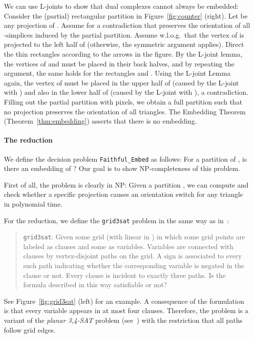 \documentclass[12pt]{article}
\begin{document}
We can use L-joints to show that dual complexes cannot always be embedded:
Consider the (partial) rectangular partition in Figure~\ref{fig:counter} (right).
Let  be any projection of . 
Assume for a contradiction that  preserves the orientation
of all -simplices induced by the partial partition. 
Assume w.l.o.g.\ that the vertex of  is projected
to the left half of  (otherwise, the symmetric argument applies).
Direct the thin rectangles according to the arrows in the figure.
By the L-joint lemma, the vertices of  and  must be placed in their
back halves, and by repeating the argument, the same holds for the rectangles  and .
Using the L-joint Lemma again, the vertex of  must be placed in the upper half of 
(caused by the L-joint with ) and also in the lower half of  (caused by the L-joint
with ), a contradiction.
Filling out the partial partition with pixels, we obtain a full partition  such that
no projection preserves the orientation of all triangles. The Embedding Theorem (Theorem~\ref{thm:embedding}) asserts
that there is no embedding.

\paragraph{The reduction}
We define the decision problem \texttt{Faithful\_Embed} as follows:
For a partition
 of , is there an embedding of ?
Our goal is to show NP-completeness of this problem. 

First of all, the problem is clearly in NP: Given a partition , 
we can compute  and check whether a specific projection causes an orientation switch 
for any triangle in polynomial time.

For the reduction, 
we define the \texttt{grid3sat} problem in the same way as in~\cite{godau-difficulty}:
\begin{quotation}
\texttt{grid3sat}: 
Given some  grid (with  linear in ) in which some grid points are labeled
as clauses and some as variables. Variables are connected with clauses by vertex-disjoint
paths on the grid. A sign is associated to every such path indicating whether the corresponding
variable is negated in the clause or not. Every clause is incident to exactly three paths.
Is the formula described in this way satisfiable or not? 
\end{quotation}

See Figure~\ref{fig:grid3sat} (left) for an example.
A consequence of the formulation is that every variable appears in at most four clauses.
Therefore, the problem is a variant of the \emph{planar 3,4-SAT} problem
(see~\cite{godau-difficulty})
with the restriction that all paths follow grid edges. 
\end{document}
